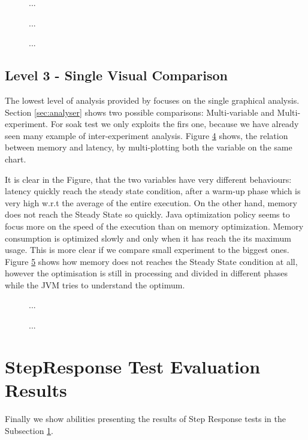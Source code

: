 \begin{figure}[hbt]
  \centering
	\caption{...} 
  	\label{fig:level2-latency}
\end{figure}

\begin{figure}[hbt]
  \centering
	\caption{...} 
  	\label{fig:level2-memory}
\end{figure}
\begin{figure}[hbt]
  \centering
	\caption{...} 
  	\label{fig:level2-memory-density}
\end{figure}

\subsection{Level 3 - Single Visual Comparison}
	
The lowest level of analysis provided by \name focuses on the single graphical analysis. Section \ref{sec:analyser} shows two possible comparisons: Multi-variable and Multi-experiment. For soak test we only exploits the firs one, because we have already seen many example of inter-experiment analysis. Figure \ref{fig:level3-memory-latency-1} shows, the relation between memory and latency, by multi-plotting both the variable on the same chart.

It is clear in the Figure, that the two variables have very different behaviours: latency quickly reach the steady state condition, after a warm-up phase which is very high w.r.t the average of the entire execution. On the other hand, memory does not reach the Steady State so quickly. Java optimization policy seems to focus more on the speed of the execution than on memory optimization. Memory consumption is optimized slowly and only when it has reach the its maximum usage. This is more clear if we compare small experiment to the biggest ones. Figure \ref{fig:level3-memory-latency-2} shows how memory does not reaches the Steady State condition at all, however the optimisation is still in processing and divided in different phases while the JVM tries to understand the optimum.


\begin{figure}[hbt]
  \centering
	\caption{...} 
  	\label{fig:level3-memory-latency-1}
\end{figure}

\begin{figure}[hbt]
  \centering
	\caption{...} 
  	\label{fig:level3-memory-latency-2}
\end{figure}


\section{StepResponse Test Evaluation Results}\label{sec:stressres}
 Finally we show \name abilities presenting the results of Step Response tests in the Subsection \ref{sec:stressres}.


